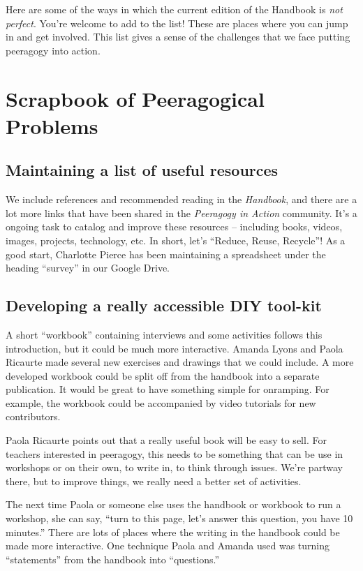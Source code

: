 Here are some of the ways in which the current edition of the Handbook
is \emph{not perfect}. You're welcome to add to the list! These are
places where you can jump in and get involved. This list gives a sense
of the challenges that we face putting peeragogy into action.

\section*{Scrapbook of Peeragogical Problems}\label{scrapbook-some-outstanding-peeragogical-problems}

\subsection{Maintaining a list of useful
resources}\label{maintaining-a-list-of-useful-resources}

We include references and recommended reading in the \emph{Handbook},
and there are a lot more links that have been shared in the
\emph{Peeragogy in Action} community. It's a ongoing task to catalog and
improve these resources -- including books, videos, images, projects,
technology, etc. In short, let's ``Reduce, Reuse, Recycle''! As a good
start, Charlotte Pierce has been maintaining a spreadsheet under the
heading ``survey'' in our Google Drive.

\subsection{Developing a really accessible DIY
tool-kit}\label{developing-a-really-accessible-diy-tool-kit}

A short ``workbook'' containing interviews and some activities follows
this introduction, but it could be much more interactive. Amanda Lyons
and Paola Ricaurte made several new exercises and drawings that we could
include. A more developed workbook could be split off from the handbook
into a separate publication. It would be great to have something simple
for onramping. For example, the workbook could be accompanied by video
tutorials for new contributors.

Paola Ricaurte points out that a really useful book will be easy to
sell. For teachers interested in peeragogy, this needs to be something
that can be use in workshops or on their own, to write in, to think
through issues. We're partway there, but to improve things, we really
need a better set of activities.

The next time Paola or someone else uses the handbook or workbook to run
a workshop, she can say, ``turn to this page, let's answer this
question, you have 10 minutes.'' There are lots of places where the
writing in the handbook could be made more interactive. One technique
Paola and Amanda used was turning ``statements'' from the handbook into
``questions.''

